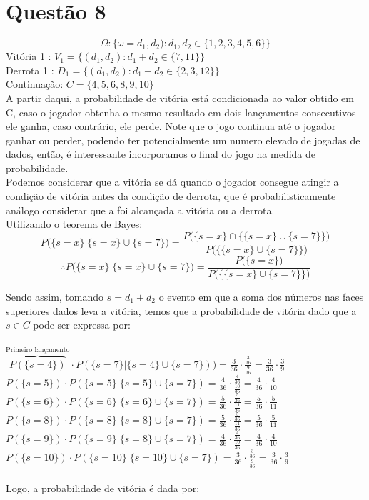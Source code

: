 \documentclass[a4paper,12pt]{report}
\begin{document}
	\section{Questão  8}
$$\Omega: \bigg\{ \omega = d_1,d_2):d_1,d_2 \in \{1,2,3,4,5,6\} \bigg\} $$
Vitória 1 : $V_1=\bigg\{(d_1,d_2): d_1+d_2 \in \{7,11 \}  \bigg\} $\\
Derrota 1 : $D_1=\bigg\{(d_1,d_2): d_1+d_2 \in \{2,3,12 \}  \bigg\} $\\
Continuação: $C=\bigg\{4,5,6,8,9,10\bigg\} $\\
A partir daqui, a probabilidade de vitória está condicionada ao valor obtido em C, caso o jogador obtenha o mesmo resultado em dois lançamentos consecutivos ele ganha, caso contrário, ele perde. Note que o jogo continua até o jogador ganhar ou perder, podendo ter potencialmente um numero elevado de jogadas de dados, então, é interessante incorporamos o final do jogo na medida de probabilidade.\\
Podemos considerar que  a vitória se dá quando o jogador consegue atingir a condição de vitória antes da condição de derrota, que é probabilisticamente  análogo considerar que a foi alcançada a vitória ou a derrota.
\\
Utilizando o teorema de Bayes:
$$P\bigg(\{s=x\}|\{s=x\}\cup\{s=7\}\bigg)=\frac{P\bigg(\{s=x\}\cap \bigg\{\{s=x\}\cup\{s=7\} \bigg\}\bigg)}{P\bigg( \bigg\{ \{s=x \}\cup\{s=7\}\bigg\} \bigg)} $$
$$
\therefore
P\bigg(\{s=x\}|\{s=x\}\cup\{s=7\}\bigg)=
\frac{P\bigg(\{s=x\}\bigg)}{P\bigg( \bigg\{ \{s=x \}\cup\{s=7\}\bigg\} \bigg)} 
$$


Sendo assim, tomando $s=d_1+d_2$ o evento em que a soma dos números nas faces superiores dados leva a vitória, temos que a probabilidade de vitória dado que a $s\in C$ pode ser expressa por:\\
\\
 $\overbrace{P(\{s=4\})}^{\text{Primeiro lançamento}}\cdot P(\{s=7\}|\{s=4\} \cup \{s=7\}) )= \frac{3}{36}\cdot\frac{\frac{3}{36}}{\frac{9}{36}}=\frac{3}{36}\cdot\frac{3}{9}$\\
  $P(\{s=5\})\cdot P(\{s=5\}|\{s=5\} \cup \{s=7\}) = \frac{4}{36}\cdot\frac{\frac{4}{36}}{\frac{10}{36}}=\frac{4}{36}\cdot\frac{4}{10}$\\
   $P(\{s=6\})\cdot P(\{s=6\}|\{s=6\} \cup \{s=7\}) = \frac{5}{36}\cdot\frac{\frac{5}{36}}{\frac{11}{36}}=\frac{5}{36}\cdot\frac{5}{11}$\\
    $P(\{s=8\})\cdot P(\{s=8\}|\{s=8\} \cup \{s=7\}) = \frac{5}{36}\cdot\frac{\frac{5}{36}}{\frac{11}{36}}=\frac{5}{36}\cdot\frac{5}{11}$\\
     $P(\{s=9\})\cdot P(\{s=9\}|\{s=8\} \cup \{s=7\}) =\frac{4}{36}\cdot\frac{\frac{4}{36}}{\frac{10}{36}}=\frac{4}{36}\cdot\frac{4}{10}$\\
      $P(\{s=10\})\cdot P(\{s=10\}|\{s=10\} \cup \{s=7\}) = \frac{3}{36}\cdot\frac{\frac{3}{36}}{\frac{9}{36}}=\frac{3}{36}\cdot\frac{3}{9}$\\
      \\
Logo, a probabilidade de vitória é dada por:
\end{document}
